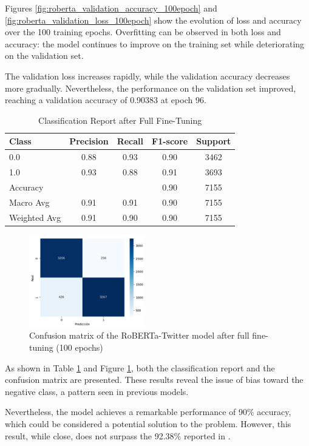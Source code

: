 Figures \ref{fig:roberta_validation_accuracy_100epoch} and \ref{fig:roberta_validation_loss_100epoch} show the evolution of loss and accuracy over the 100 training epochs. Overfitting can be observed in both loss and accuracy: the model continues to improve on the training set while deteriorating on the validation set. 

The validation loss increases rapidly, while the validation accuracy decreases more gradually. Nevertheless, the performance on the validation set improved, reaching a validation accuracy of 0.90383 at epoch 96.

\begin{table}[H]
\centering
\caption{Classification Report after Full Fine-Tuning}
\label{tab:classification_report_final}
\begin{tabular}{lcccc}
\toprule
Class        & Precision & Recall & F1-score & Support \\
\midrule
0.0          & 0.88      & 0.93   & 0.90     & 3462    \\
1.0          & 0.93      & 0.88   & 0.91     & 3693    \\
\midrule
Accuracy     &           &        & 0.90     & 7155    \\
Macro Avg    & 0.91      & 0.91   & 0.90     & 7155    \\
Weighted Avg & 0.91      & 0.90   & 0.90     & 7155    \\
\bottomrule
\end{tabular}
\end{table}


\begin{figure}[H]
    \centering
    \includegraphics[width=0.45\textwidth]{images/robertaConfusionMatrix100Epochs.png} 
    \caption{Confusion matrix of the RoBERTa-Twitter model after full fine-tuning (100 epochs)}
    \label{fig:roberta_confusion_matrix_100epochs}
\end{figure}

As shown in Table \ref{tab:classification_report_final} and Figure \ref{fig:roberta_confusion_matrix_100epochs}, both the classification report and the confusion matrix are presented. These results reveal the issue of bias toward the negative class, a pattern seen in previous models. 

Nevertheless, the model achieves a remarkable performance of 90\% accuracy, which could be considered a potential solution to the problem. However, this result, while close, does not surpass the 92.38\% reported in \cite{fieri2023offensive}.
